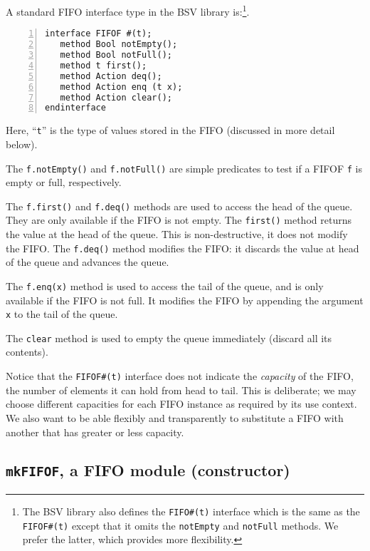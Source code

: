 A standard FIFO interface type in the BSV library is:\footnote{The BSV
library also defines the {\tt FIFO\#(t)} interface which is the same
as the {\tt FIFOF\#(t)} except that it omits the {\tt notEmpty} and
{\tt notFull} methods.  We prefer the latter, which provides more
flexibility.}.

{\small
\begin{Verbatim}[frame=single, numbers=left]
interface FIFOF #(t);
   method Bool notEmpty();
   method Bool notFull();
   method t first();
   method Action deq();
   method Action enq (t x);
   method Action clear();
endinterface
\end{Verbatim}
}

Here, ``\verb|t|'' is the type of values stored in the FIFO (discussed
in more detail below).

The \verb|f.notEmpty()| and \verb|f.notFull()| are simple predicates
to test if a FIFOF {\tt f} is empty or full, respectively.

The \verb|f.first()| and \verb|f.deq()| methods are used to access the
head of the queue.  They are only available if the FIFO is not empty.
The \verb|first()| method returns the value at the head of the queue.
This is non-destructive, {\ie} it does not modify the FIFO.  The
\verb|f.deq()| method modifies the FIFO: it discards the value at head
of the queue and advances the queue.

The \verb|f.enq(x)| method is used to access the tail of the queue,
and is only available if the FIFO is not full.  It modifies the FIFO
by appending the argument \verb|x| to the tail of the queue.

The \verb|clear| method is used to empty the queue immediately
(discard all its contents).

Notice that the {\tt FIFOF\#(t)} interface does not indicate the
\emph{capacity} of the FIFO, {\ie} the number of elements it can hold
from head to tail.  This is deliberate; we may choose different
capacities for each FIFO instance as required by its use context.  We
also want to be able flexibly and transparently to substitute a FIFO
with another that has greater or less capacity.


\subsection{{\tt mkFIFOF}, a FIFO module (constructor)}

